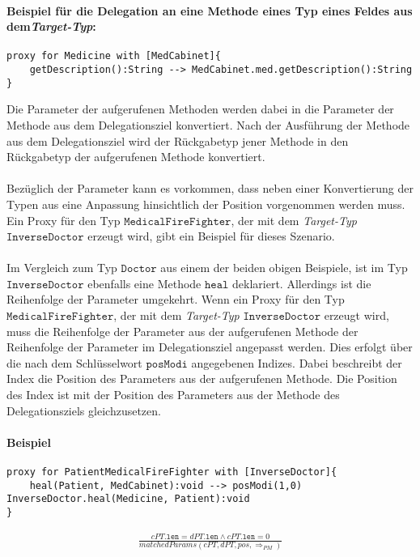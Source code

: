 \documentclass[a4paper,12pt]{article}
\begin{document}
\paragraph{Beispiel für die Delegation an eine Methode eines Typ eines Feldes aus dem\emph{Target-Typ}:}
\begin{lstlisting}[style = dsl]
proxy for Medicine with [MedCabinet]{
	getDescription():String --> MedCabinet.med.getDescription():String
}
\end{lstlisting}
Die Parameter der aufgerufenen Methoden werden dabei in die Parameter der Methode aus dem Delegationsziel konvertiert. Nach der Ausführung der Methode aus dem Delegationsziel wird der Rückgabetyp jener Methode in den Rückgabetyp der aufgerufenen Methode konvertiert.\\\\
Bezüglich der Parameter kann es vorkommen, dass neben einer Konvertierung der Typen aus eine Anpassung hinsichtlich der Position vorgenommen werden muss. Ein Proxy für den Typ $\texttt{MedicalFireFighter}$, der mit dem \emph{Target-Typ} $\texttt{InverseDoctor}$ erzeugt wird, gibt ein Beispiel für dieses Szenario.\\\\
Im Vergleich zum Typ $\texttt{Doctor}$ aus einem der beiden obigen Beispiele, ist im Typ $\texttt{InverseDoctor}$ ebenfalls eine Methode $\texttt{heal}$ deklariert. Allerdings ist die Reihenfolge der Parameter umgekehrt. Wenn ein Proxy für den Typ $\texttt{MedicalFireFighter}$, der mit dem \emph{Target-Typ} $\texttt{InverseDoctor}$ erzeugt wird, muss die Reihenfolge der Parameter aus der aufgerufenen Methode der Reihenfolge der Parameter im Delegationsziel angepasst werden. Dies erfolgt über die nach dem Schlüsselwort $\texttt{posModi}$ angegebenen Indizes. Dabei beschreibt der Index die Position des Parameters aus der aufgerufenen Methode. Die Position des Index ist mit der Position des Parameters aus der Methode des Delegationsziels gleichzusetzen.
\paragraph{Beispiel}

\begin{lstlisting}[style = dsl]
proxy for PatientMedicalFireFighter with [InverseDoctor]{
	heal(Patient, MedCabinet):void --> posModi(1,0) InverseDoctor.heal(Medicine, Patient):void
}
\end{lstlisting}



\begin{gather*}
\frac{cPT\texttt{.len} = dPT\texttt{.len} \wedge cPT\texttt{.len} = 0}
{matchedParams(cPT,dPT,pos, \Rightarrow_{PM})}
\end{gather*}
\end{document}
